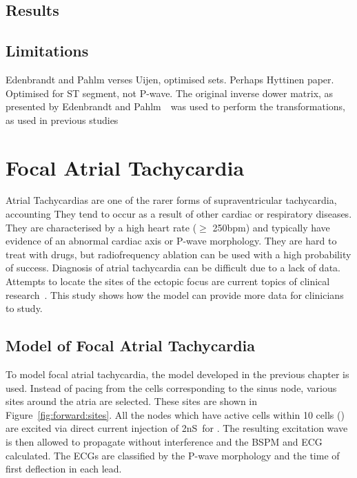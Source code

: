 \subsection{Results}





\subsection{Limitations}

Edenbrandt and Pahlm verses Uijen, optimised sets.  Perhaps Hyttinen paper.
Optimised for ST segment, not P-wave.
The original inverse dower matrix, as presented by Edenbrandt and
Pahlm~\cite{Edenbrandt1988}\ was used to perform the transformations, as used in
previous studies~\cite{Carlson2005,Holmqvist2007,Havmoller2007}

\section{Focal Atrial Tachycardia}

Atrial Tachycardias are one of the rarer forms of supraventricular
tachycardia, accounting 
They tend to occur as a result of other cardiac or respiratory diseases.
They are characterised by a high heart rate ($\geq$ \unit{250}{bpm}) and
typically have evidence of an abnormal cardiac axis or P-wave morphology.
They are hard to treat with drugs, but radiofrequency ablation can be used with
a high probability of success.
Diagnosis of atrial tachycardia can be difficult due to a lack of data.
Attempts to locate the sites of the ectopic focus are current topics of clinical
research~\cite{kistler2006,Kahn2006,yamane2001}.
This study shows how the model can provide more data for clinicians to study.

\subsection{Model of Focal Atrial Tachycardia}

To model focal atrial tachycardia, the model developed in the previous chapter
is used.
Instead of pacing from the cells corresponding to the sinus node, various sites
around the atria are selected.
These sites are shown in Figure~\ref{fig:forward:sites}.
All the nodes which have active cells within 10 cells () are excited via
direct current injection of \unit{2}{nS}\ for .
The resulting excitation wave is then allowed to propagate without interference
and the BSPM and ECG calculated.
The ECGs are classified by the P-wave morphology and the time of first
deflection in each lead.



